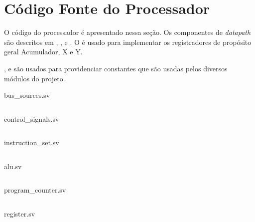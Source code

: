 \documentclass[
	12pt,				  %
	openright,		%
	a4paper,			%
	english,			%
	french,				%
	spanish,			%
	brazil,				%
]{abntex2}
\newenvironment{longlisting}{\captionsetup{type=listing}}{}
\begin{document}
\section{Código Fonte do Processador}

O código do processador é apresentado nessa seção. Os componentes de \emph{datapath}
são descritos em , ,
 e . O 
é usado para implementar os registradores de propósito geral Acumulador, X e Y.

,  e  são usados
para providenciar constantes que são usadas pelos diversos módulos do projeto.

\begin{longlisting}
	\caption[Enums para barramentos]{bus{\_}sources.sv}
	\inputminted{systemverilog}{../quartus/synthesis/enums/bus_sources.sv}
	\label{code:bus_sources}
\end{longlisting}

\begin{longlisting}
	\caption[Enums para sinais de controle]{control{\_}signals.sv}
	\inputminted{systemverilog}{../quartus/synthesis/enums/control_signals.sv}
	\label{code:control_signals}
\end{longlisting}

\begin{longlisting}
	\caption[Enums para conjunto de instrução]{instruction{\_}set.sv}
	\inputminted{systemverilog}{../quartus/synthesis/enums/instruction_set.sv}
	\label{code:instruction_set}
\end{longlisting}

\begin{longlisting}
	\caption[Módulo ULA]{alu.sv}
	\inputminted[firstline=5]{systemverilog}{../quartus/synthesis/alu.sv}
	\label{code:alu}
\end{longlisting}


\begin{longlisting}
	\caption[Módulo Contador de Programa]{program{\_}counter.sv}
	\inputminted{systemverilog}{../quartus/synthesis/program_counter.sv}
	\label{code:program_counter}
\end{longlisting}

\begin{longlisting}
	\caption[Módulo Registrador]{register.sv}
	\inputminted{systemverilog}{../quartus/synthesis/register.sv}
	\label{code:register}
\end{longlisting}
\end{document}
